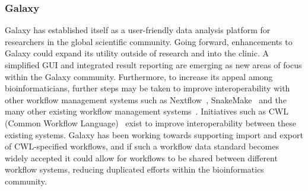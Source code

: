 \subsubsection{Galaxy}
Galaxy has established itself as a user-friendly data analysis platform for researchers in the global scientific community. Going forward, enhancements to Galaxy could expand its utility outside of research and into the clinic. A simplified GUI and integrated result reporting are emerging as new areas of focus within the Galaxy community.
Furthermore, to increase its appeal among bioinformaticians, further steps may be taken to improve interoperability with other workflow management systems such as Nextflow~\cite{di2017nextflow}, SnakeMake~\cite{koster2012snakemake} and the many other existing workflow management systems~\cite{workflow-engines}.
Initiatives such as CWL (Common Workflow Language)~\cite{amstutz2016common} exist to improve interoperability between these existing systems. Galaxy has been working towards supporting import and export of CWL-specified workflows, and if such a workflow data standard becomes widely accepted it could allow for workflows to be shared between different workflow systems, reducing duplicated efforts within the bioinformatics community.

